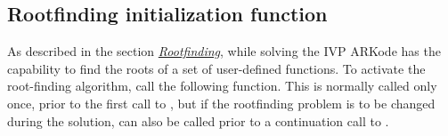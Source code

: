 \documentclass[letterpaper,10pt,english]{sphinxmanual}
\begin{document}
\subsection{Rootfinding initialization function}
\label{c_interface/User_callable:cinterface-rootfinding}\label{c_interface/User_callable:rootfinding-initialization-function}
As described in the section {\hyperref[Mathematics:mathematics-rootfinding]{\emph{Rootfinding}}}, while
solving the IVP ARKode has the capability to find the roots of a set
of user-defined functions.  To activate the root-finding algorithm,
call the following function.  This is normally called only once, prior
to the first call to {\hyperref[c_interface/User_callable:ARKode]{}}, but if the rootfinding
problem is to be changed during the solution,
{\hyperref[c_interface/User_callable:ARKodeRootInit]{}} can also be called prior to a continuation
call to {\hyperref[c_interface/User_callable:ARKode]{}}.
\end{document}
